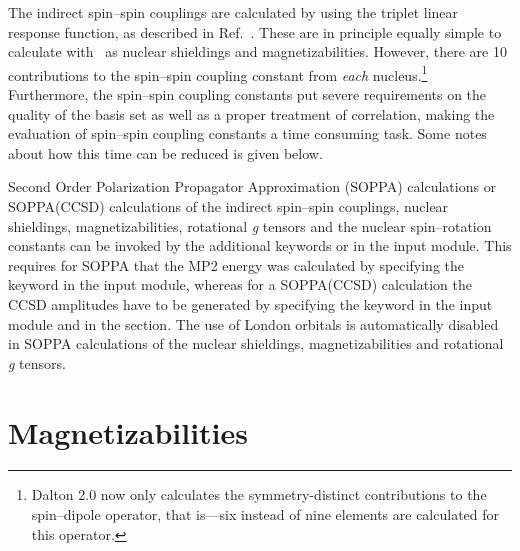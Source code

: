 The indirect spin--spin couplings are calculated by using the triplet linear
response function, as described in
Ref.~\cite{ovhapjhjajsbpthjcp96}.
These are in principle equally simple to calculate with \siraba\ as
nuclear shieldings and magnetizabilities. However, there are 10
contributions to the spin--spin coupling constant from {\em each}
nucleus.\footnote{Dalton 2.0 now only calculates the symmetry-distinct
  contributions to the spin--dipole operator, that is---six instead of
  nine elements are calculated for this operator.} Furthermore, the
spin--spin coupling constants put severe 
requirements on the quality of the basis set as well as a proper
treatment of correlation, making the evaluation of spin--spin coupling
constants a time consuming task. Some notes about how this time
can be reduced is given below.

Second Order Polarization Propagator Approximation (SOPPA)  
 calculations 
\cite{esnpjjodjcp73,jopjdycpr2,mjpekdtehjajjojcp,spascpl260,tejospastcan100}
or SOPPA(CCSD)  calculations
\cite{soppaccsd,spascpl260,tejospastcan100}  of the indirect spin--spin
couplings, nuclear shieldings, magnetizabilities, rotational {\em g} tensors
and the nuclear spin--rotation constants can be invoked by the additional
keywords  or  in the  input
module. This requires for SOPPA that the MP2 energy was calculated by
specifying the keyword  
in the  input module, whereas for a SOPPA(CCSD)
calculation the CCSD amplitudes have to be generated by specifying the
keyword  in the  input module and
 in the  section. The use of London orbitals is
automatically disabled in SOPPA calculations of the nuclear shieldings,
magnetizabilities and rotational {\em g} tensors. 

\section{Magnetizabilities}\label{sec:magnetizability}

